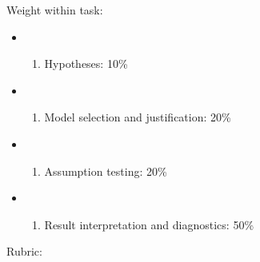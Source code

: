 \documentclass[
  10pt,
]{article}
\providecommand{\tightlist}{%
  \setlength{\itemsep}{0pt}\setlength{\parskip}{0pt}}
\begin{document}
Weight within task:

\begin{itemize}
\tightlist
\item
  \begin{enumerate}
  \def\labelenumi{(\arabic{enumi})}
  \tightlist
  \item
    Hypotheses: 10\%
  \end{enumerate}
\item
  \begin{enumerate}
  \def\labelenumi{(\arabic{enumi})}
  \setcounter{enumi}{1}
  \tightlist
  \item
    Model selection and justification: 20\%
  \end{enumerate}
\item
  \begin{enumerate}
  \def\labelenumi{(\arabic{enumi})}
  \setcounter{enumi}{2}
  \tightlist
  \item
    Assumption testing: 20\%
  \end{enumerate}
\item
  \begin{enumerate}
  \def\labelenumi{(\arabic{enumi})}
  \setcounter{enumi}{3}
  \tightlist
  \item
    Result interpretation and diagnostics: 50\%
  \end{enumerate}
\end{itemize}

Rubric:
\end{document}
